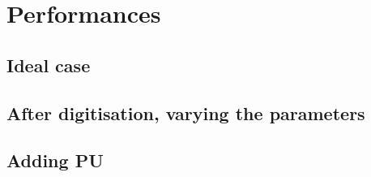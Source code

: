 %
%
%
\clearpage
\section{Performances}
\label{sec:perf}

\subsection{Ideal case}

\subsection{After digitisation, varying the parameters}

\subsection{Adding PU}